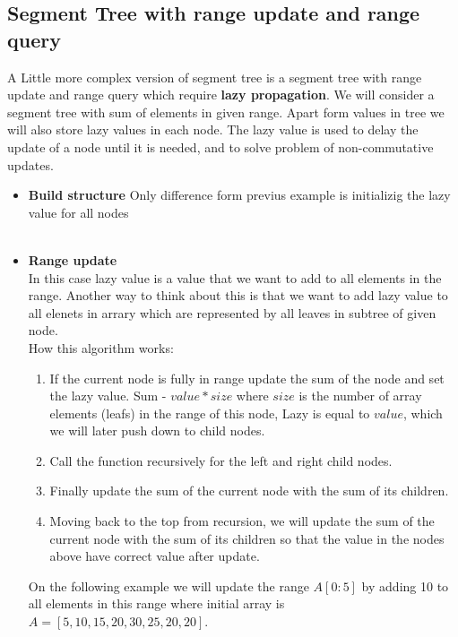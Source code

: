 \documentclass{article}
\begin{document}
\subsection{Segment Tree with range update and range query}
A Little more complex version of segment tree is a segment tree with range update and range query which require \textbf{lazy propagation}.
We will consider a segment tree with sum of elements in given range. 
Apart form values in tree we will also store lazy values in each node.
The lazy value is used to delay the update of a node until it is needed, and 
to solve problem of non-commutative updates.


\begin{itemize}
    \item \textbf{Build structure} 
    Only difference form previus example is initializig the lazy value for all nodes \\
    \\


    \item \textbf{Range update} \\
    In this case lazy value is a value that we want to add to all elements in the range.
    Another way to think about this is that we want to add lazy value to all elenets in arrary 
    which are represented by all leaves in subtree of given node.
     \\
    How this algorithm works:
    \begin{enumerate}
        \item If the current node is fully in range update the sum of the node and set the lazy value. Sum - $value*size$ where $size$ is the number of array elements (leafs) in the range of this node, Lazy is equal to $value$, which we will later push down to child nodes.
        \item Call the function recursively for the left and right child nodes.
        \item Finally update the sum of the current node with the sum of its children.
        \item Moving back to the top from recursion, we will update the sum of the current node with the sum of its children so that the value in the nodes above have correct value after update.
    \end{enumerate}
On the following example we will update the range \(A[0:5]\) by adding 10 to all elements in this range
where initial array is \(A = [5, 10, 15, 20, 30, 25, 20, 20]\).
    

\end{itemize}
\end{document}
